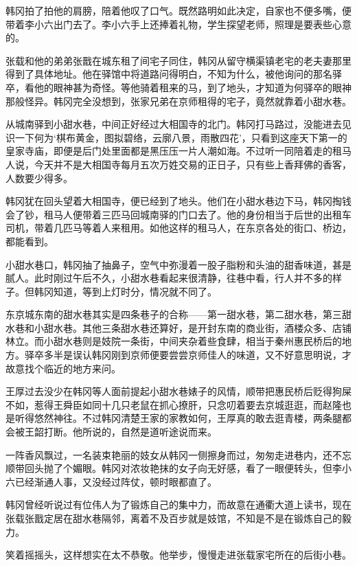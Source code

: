 韩冈拍了拍他的肩膀，陪着他叹了口气。既然路明如此决定，自家也不便多嘴，便带着李小六出门去了。李小六手上还捧着礼物，学生探望老师，照理是要表些心意的。

张载和他的弟弟张戬在城东租了间宅子同住，韩冈从留守横渠镇老宅的老夫妻那里得到了具体地址。他在驿馆中将道路问得明白，不知为什么，被他询问的那名驿卒，看他的眼神甚为奇怪。等他骑着租来的马，到了地头，才知道为何驿卒的眼神那般怪异。韩冈完全没想到，张家兄弟在京师租得的宅子，竟然就靠着小甜水巷。

从城南驿到小甜水巷，中间正好经过大相国寺的北门。韩冈打马路过，没能进去见识一下何为‘棋布黄金，图拟碧络，云廓八景，雨散四花’，只看到这座天下第一的皇家寺庙，即便是后门处里面都是黑压压一片人潮如海。不过听一同陪着走的租马人说，今天并不是大相国寺每月五次万姓交易的正日子，只有些上香拜佛的香客，人数要少得多。

韩冈犹在回头望着大相国寺，便已经到了地头。他们在小甜水巷边下马，韩冈掏钱会了钞，租马人便带着三匹马回城南驿的门口去了。他的身份相当于后世的出租车司机，带着几匹马等着人来租用。如他这样的租马人，在东京各处的街口、桥边，都能看到。

小甜水巷口，韩冈抽了抽鼻子，空气中弥漫着一股子脂粉和头油的甜香味道，甚是腻人。此时刚过午后不久，小甜水巷看起来很清静，往巷中看，行人并不多的样子。但韩冈知道，等到上灯时分，情况就不同了。

东京城东南的甜水巷其实是四条巷子的合称——第一甜水巷，第二甜水巷，第三甜水巷和小甜水巷。其他三条甜水巷还算好，是开封东南的商业街，酒楼众多、店铺林立。而小甜水巷则是妓院一条街，中间夹杂着些食肆，相当于秦州惠民桥后的地方。驿卒多半是误认韩冈刚到京师便要尝尝京师佳人的味道，又不好意思明说，才故意找个临近的地方来问。

王厚过去没少在韩冈等人面前提起小甜水巷婊子的风情，顺带把惠民桥后贬得狗屎不如，惹得王舜臣如同十几只老鼠在抓心撩肝，只念叨着要去京城逛逛，而赵隆也是听得悠然神往。不过韩冈清楚王家的家教如何，王厚真的敢去逛青楼，两条腿都会被王韶打断。他所说的，自然是道听途说而来。

一阵香风飘过，一名装束艳丽的妓女从韩冈一侧擦身而过，匆匆走进巷内，还不忘顺带回头抛了个媚眼。韩冈对浓妆艳抹的女子向无好感，看了一眼便转头，但李小六已经渐通人事，又没经过阵仗，顿时眼都直了。

韩冈曾经听说过有位伟人为了锻炼自己的集中力，而故意在通衢大道上读书，现在张载张戬定居在甜水巷隔邻，离着不及百步就是妓馆，不知是不是在锻炼自己的毅力。

笑着摇摇头，这样想实在太不恭敬。他举步，慢慢走进张载家宅所在的后街小巷。

